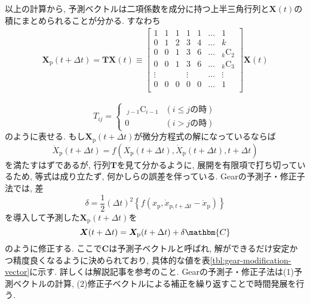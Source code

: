 以上の計算から, 予測ベクトルは二項係数を成分に持つ上半三角行列と$\bm{X}(t)$の積にまとめられることが分かる. すなわち
\begin{align}
  \bm{X}_{\mathrm{p}}(t + \Delta t)
  =
  \bm{T} \bm{X}(t)
  \equiv
  \begin{bmatrix}
    1 & 1 & 1 & 1 & 1 & \ldots & 1 \\
    0 & 1 & 2 & 3 & 4 & \ldots & k \\
    0 & 0 & 1 & 3 & 6 & \ldots & _k \mathrm{C}_{2} \\
    0 & 0 & 1 & 3 & 6 & \ldots & _k \mathrm{C}_{3} \\
    \vdots& & & \vdots& & \ldots & \vdots \\
    0 & 0 & 0 & 0 & 0 & \ldots & 1 \\
  \end{bmatrix}
  \bm{X}(t)
\end{align}

\begin{equation}
  T_{ij} =
  \begin{cases}
    ~_{j-1} \mathrm{C}_{i-1} & ( i \le j \mathrm{の時} )\\
    0                        & (i > j \mathrm{の時})
  \end{cases}
\end{equation}
のように表せる. もし$\bm{X}_{\mathrm{p}} (t + \Delta t)$が微分方程式の解になっているならば
\begin{equation}
  \ddot{X}_{\mathrm{p}} (t + \Delta t)
  =
  f(
    X_{\mathrm{p}} (t + \Delta t),
    \dot{X}_{\mathrm{p}} (t + \Delta t),
    t + \Delta t
  )
\end{equation}
を満たすはずであるが, 行列$\bm{T}$を見て分かるように, 展開を有限項で打ち切っているため, 等式は成り立たず, 何かしらの誤差を伴っている.
Gearの予測子・修正子法では, 差
\begin{equation}
  \delta
  =
  \frac{1}{2} (\Delta t)^{2}
  \left\{
    f(x_{\mathrm{p}}, \dot{x}_{\mathrm{p}, t+\Delta t} - \ddot{x}_{\mathrm{p}})
  \right\}
\end{equation}
を導入して予測した$\bm{X}_{\mathrm{p}}(t + \Delta t)$を
\begin{equation}
  \bm{X}(t + \Delta t)
  =
  \bm{X}_{\mathrm{p}} (t + \Delta t) + \delta \mathbm{C}
\end{equation}
のように修正する. ここで$\bm{C}$は予測子ベクトルと呼ばれ, 解ができるだけ安定かつ精度良くなるように決められており, 具体的な値を表\ref{tbl:gear-modification-vector}に示す. 詳しくは解説記事\cite{2003Nose}を参考のこと. Gearの予測子・修正子法は(1)予測ベクトルの計算, (2)修正子ベクトルによる補正を繰り返すことで時間発展を行う.

